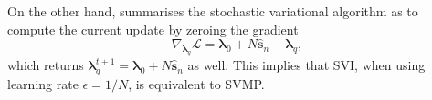 \documentclass{article} %
\begin{document}
On the other hand, \cite{mandt:smoothedSVI} summarises the stochastic variational algorithm as to compute the current update by zeroing the gradient
\begin{equation}
\nabla_{\bm{\lambda}_q} \mathcal{L} = \bm{\lambda}_0 + N \hat{\bm{s}}_n - \bm{\lambda}_q,
\end{equation}
which returns $\bm{\lambda}_q^{t+1} = \bm{\lambda}_0 + N \hat{\bm{s}}_n$ as well. This implies that SVI, when using learning rate $\epsilon = 1/N$, is equivalent to SVMP. 

%
%
\end{document}
